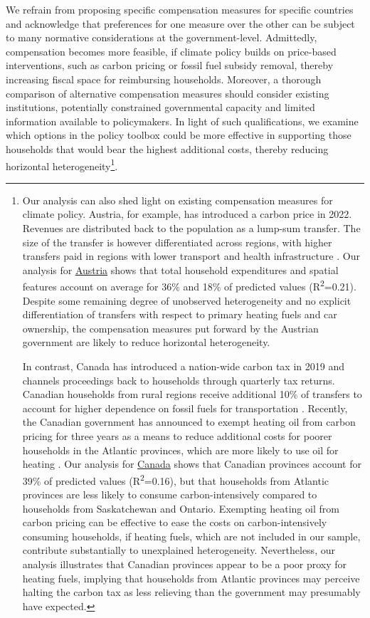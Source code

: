\documentclass[12pt, a4paper]{article}
\begin{document}
We refrain from proposing specific compensation measures for specific countries and acknowledge that preferences for one measure over the other can be subject to many normative considerations at the government-level. Admittedly, compensation becomes more feasible, if climate policy builds on price-based interventions, such as carbon pricing or fossil fuel subsidy removal, thereby increasing fiscal space for reimbursing households. Moreover, a thorough comparison of alternative compensation measures should consider existing institutions, potentially constrained governmental capacity and limited information available to policymakers. In light of such qualifications, we examine which options in the policy toolbox could be more effective in supporting those households that would bear the highest additional costs, thereby reducing horizontal heterogeneity\footnote{Our analysis can also shed light on existing compensation measures for climate policy. Austria, for example, has introduced a carbon price in 2022. Revenues are distributed back to the population as a lump-sum transfer. The size of the transfer is however differentiated across regions, with higher transfers paid in regions with lower transport and health infrastructure \autocite{BMK.2023}. Our analysis for \hyperref[fig:5b_AUT]{Austria} shows that total household expenditures and spatial features account on average for 36\% and 18\% of predicted values (R\textsuperscript{2}=0.21). Despite some remaining degree of unobserved heterogeneity and no explicit differentiation of transfers with respect to primary heating fuels and car ownership, the compensation measures put forward by the Austrian government are likely to reduce horizontal heterogeneity.

In contrast, Canada has introduced a nation-wide carbon tax in 2019 and channels proceedings back to households through quarterly tax returns. Canadian households from rural regions receive additional 10\% of transfers to account for higher dependence on fossil fuels for transportation \autocite{GovernmentofCanada.2023}. Recently, the Canadian government has announced to exempt heating oil from carbon pricing for three years as a means to reduce additional costs for poorer households in the Atlantic provinces, which are more likely to use oil for heating \autocite{Reuters.2023}. Our analysis for \hyperref[fig:5b_CAN]{Canada} shows that Canadian provinces account for 39\% of predicted values (R\textsuperscript{2}=0.16), but that households from Atlantic provinces are less likely to consume carbon-intensively compared to households from Saskatchewan and Ontario. Exempting heating oil from carbon pricing can be effective to ease the costs on carbon-intensively consuming households, if heating fuels, which are not included in our sample, contribute substantially to unexplained heterogeneity. Nevertheless, our analysis illustrates that Canadian provinces appear to be a poor proxy for heating fuels, implying that households from Atlantic provinces may perceive halting the carbon tax as less relieving than the government may presumably have expected.}.
\end{document}
